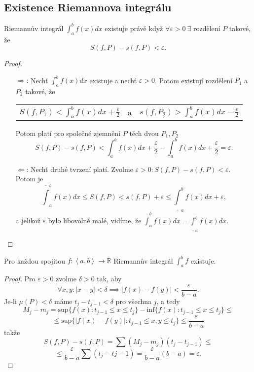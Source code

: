\documentclass[../main.tex]{subfiles}
\begin{document}
\subsection{Existence Riemannova integrálu}
\begin{theorem}
	Riemannův integrál $\int^b_a f(x) dx$ existuje právě když $\forall \varepsilon > 0\ \exists$ rozdělení $P$ takové, že
	\[S(f,P) - s(f,P) < \varepsilon.\]
\end{theorem}

\begin{proof}
	\begin{enumerate}
		\item[$\Rightarrow$:] Nechť $\int^b_a f(x) dx$ existuje a nechť $\varepsilon > 0$. Potom existují rozdělení $P_1$ a $P_2$ takové, že
	    \begin{center}
	        \begin{tabular}{ c c c }
	            $S(f,P_1) < \int^b_a f(x) dx + \frac{\varepsilon}{2}$ & a & $s(f,P_2) > \int^b_a f(x) dx - \frac{\varepsilon}{2}$  \\
	        \end{tabular}
	    \end{center}
	    Potom platí pro společné zjemnění $P$ těch dvou $P_1,P_2$
	    \[S(f,P) - s(f,P) < \int^b_a f(x)dx + \frac{\varepsilon}{2} - \int^b_a f(x)dx + \frac{\varepsilon}{2} = \varepsilon.\]
	    \item[$\Leftarrow$:] Nechť druhé tvrzení platí. Zvolme $\varepsilon > 0 : S(f,P) - s(f,P) < \varepsilon.$ Potom je 
	    \[\overline{\int}^b_a f(x)dx \leq S(f,P) < s(f,P) + \varepsilon \leq \underline{\int}^b_a f(x)dx + \varepsilon,\]
	    a jelikož $\varepsilon$ bylo libovolně malé, vidíme, že $\overline{\int}^b_a f(x)dx = \underline{\int}^b_a f(x)dx.$
	\end{enumerate}
\end{proof}

\begin{theorem}
	Pro každou spojitou $f : \left<a,b\right> \rightarrow \mathbb{R}$ Riemannův integrál $\int^b_a f$ existuje.
\end{theorem}

\begin{proof}
	Pro $\varepsilon > 0 $ zvolme $\delta > 0$ tak, aby 
	\[\forall x,y : |x-y| < \delta \implies |f(x) - f(y)| < \frac{\varepsilon}{b-a}.\]
	Je-li $\mu(P) < \delta$ máme $t_j-t_{j-1} < \delta$ pro všechna $j$, a tedy
	\[M_j - m_j = \text{sup}\{f(x) : t_{j-1} \leq x \leq t_j\} - \text{inf}\{f(x) : t_{j-1} \leq x \leq t_j\} \leq\]
	\[\leq \text{sup}\{|f(x) - f(y)| : t_{j-1} \leq x,y \leq t_j\} \leq \frac{\varepsilon}{b-a}\]
	takže
	\[S(f,P) - s(f,P) = \sum (M_j - m_j)(t_j-t_{j-1})\leq\]
	\[\leq \frac{\varepsilon}{b-a}\sum (t_j-t{j-1}) = \frac{\varepsilon}{b-a}(b-a) = \varepsilon.\]
\end{proof}
\end{document}
